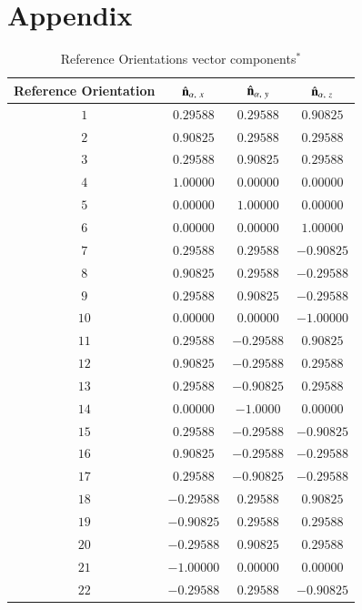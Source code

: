 \documentclass[final, 3p]{elsarticle}
\begin{document}
\section*{Appendix}
\setcounter{table}{0}
\renewcommand{\thetable}{A\arabic{table}}
\begin{table}[h]
\begin{center}
\caption{\label{tab:A1}
%
Reference Orientations vector components$^*$}
\begin{tabular}{|c|c|c|c|}
\hline\hline
Reference Orientation & $\hat{\bf n}_{\alpha,\ x}$ &  $\hat{\bf n}_{\alpha,\ y}$ &  $\hat{\bf n}_{\alpha,\ z}$ \\
\hline
$1$  & $ 0.29588$ &  $ 0.29588$ & $ 0.90825$ \\
$2$  & $ 0.90825$ &  $ 0.29588$ & $ 0.29588$ \\
$3$  & $ 0.29588$ &  $ 0.90825$ & $ 0.29588$ \\
$4$  & $ 1.00000$ &  $ 0.00000$ & $ 0.00000$ \\
$5$  & $ 0.00000$ &  $ 1.00000$ & $ 0.00000$ \\
$6$  & $ 0.00000$ &  $ 0.00000$ & $ 1.00000$ \\
$7$  & $ 0.29588$ &  $ 0.29588$ & $-0.90825$ \\
$8$  & $ 0.90825$ &  $ 0.29588$ & $-0.29588$ \\
$9$  & $ 0.29588$ &  $ 0.90825$ & $-0.29588$ \\
$10$ & $ 0.00000$ &  $ 0.00000$ & $-1.00000$ \\
$11$ & $ 0.29588$ &  $-0.29588$ & $ 0.90825$ \\
$12$ & $ 0.90825$ &  $-0.29588$ & $ 0.29588$ \\
$13$ & $ 0.29588$ &  $-0.90825$ & $ 0.29588$ \\
$14$ & $ 0.00000$ &  $ -1.0000$ & $ 0.00000$ \\
$15$ & $ 0.29588$ &  $-0.29588$ & $-0.90825$ \\
$16$ & $ 0.90825$ &  $-0.29588$ & $-0.29588$ \\
$17$ & $ 0.29588$ &  $-0.90825$ & $-0.29588$ \\
$18$ & $-0.29588$ &  $ 0.29588$ & $ 0.90825$ \\
$19$ & $-0.90825$ &  $ 0.29588$ & $ 0.29588$ \\
$20$ & $-0.29588$ &  $ 0.90825$ & $ 0.29588$ \\
$21$ & $-1.00000$ &  $ 0.00000$ & $ 0.00000$ \\
$22$ & $-0.29588$ &  $ 0.29588$ & $-0.90825$ \\

\end{tabular}
\end{center}
\end{table}
\end{document}

